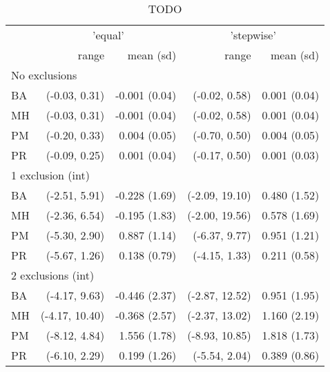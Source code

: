 \begin{table}[t]
\caption{TODO} 
\fontsize{12.0pt}{14.4pt}\selectfont
\begin{tabular}{lrrrr}
\toprule
 & \multicolumn{2}{c}{'equal'} & \multicolumn{2}{c}{'stepwise'} \\ 
\cmidrule(lr){2-3} \cmidrule(lr){4-5}
 & range & mean (sd) & range & mean (sd) \\ 
\midrule
\multicolumn{5}{l}{No exclusions} \\ 
\midrule
\hspace{11.25pt} BA & (-0.03, 0.31) & -0.001 (0.04) & (-0.02, 0.58) & 0.001 (0.04) \\ 
\hspace{11.25pt} MH & (-0.03, 0.31) & -0.001 (0.04) & (-0.02, 0.58) & 0.001 (0.04) \\ 
\hspace{11.25pt} PM & (-0.20, 0.33) & 0.004 (0.05) & (-0.70, 0.50) & 0.004 (0.05) \\ 
\hspace{11.25pt} PR & (-0.09, 0.25) & 0.001 (0.04) & (-0.17, 0.50) & 0.001 (0.03) \\ 
\midrule
\multicolumn{5}{l}{1 exclusion (int)} \\ 
\midrule
\hspace{11.25pt} BA & (-2.51, 5.91) & -0.228 (1.69) & (-2.09, 19.10) & 0.480 (1.52) \\ 
\hspace{11.25pt} MH & (-2.36, 6.54) & -0.195 (1.83) & (-2.00, 19.56) & 0.578 (1.69) \\ 
\hspace{11.25pt} PM & (-5.30, 2.90) & 0.887 (1.14) & (-6.37, 9.77) & 0.951 (1.21) \\ 
\hspace{11.25pt} PR & (-5.67, 1.26) & 0.138 (0.79) & (-4.15, 1.33) & 0.211 (0.58) \\ 
\midrule
\multicolumn{5}{l}{2 exclusions (int)} \\ 
\midrule
\hspace{11.25pt} BA & (-4.17, 9.63) & -0.446 (2.37) & (-2.87, 12.52) & 0.951 (1.95) \\ 
\hspace{11.25pt} MH & (-4.17, 10.40) & -0.368 (2.57) & (-2.37, 13.02) & 1.160 (2.19) \\ 
\hspace{11.25pt} PM & (-8.12, 4.84) & 1.556 (1.78) & (-8.93, 10.85) & 1.818 (1.73) \\ 
\hspace{11.25pt} PR & (-6.10, 2.29) & 0.199 (1.26) & (-5.54, 2.04) & 0.389 (0.86) \\ 

\end{tabular}
\end{table}

